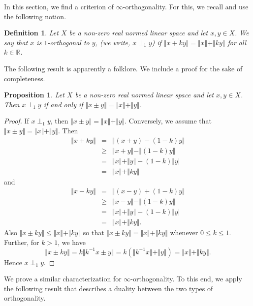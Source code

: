 \documentclass[12pt]{amsart}
\newtheorem{proposition}[theorem]{Proposition}
\newtheorem{definition}[theorem]{Definition}
\begin{document}
In this section, we find a criterion of $\infty$-orthogonality. For this, we recall and use the following notion.
\begin{definition}\cite{K14} 
	Let $X$ be a non-zero real normed linear space and let $x, y \in X$. We say that $x$ is $1$-orthogonal to $y$, (we write, $x \perp_1 y$) if $\Vert x + k y \Vert = \Vert x \Vert + \Vert k y \Vert$ for all $k \in \mathbb{R}$. %
\end{definition} 
The following result is apparently a folklore. We include a proof for the sake of completeness. 
\begin{proposition}\label{orth1}
	Let $X$ be a non-zero real normed linear space and let $x, y \in X$. Then $x \perp_1 y$ if and only if $\Vert x \pm y \Vert = \Vert x \Vert + \Vert y \Vert$. 
\end{proposition}
\begin{proof}
	If $x \perp_1 y$, then $\Vert x \pm y \Vert = \Vert x \Vert + \Vert y \Vert$. Conversely, we assume that $\Vert x \pm y \Vert = \Vert x \Vert + \Vert y \Vert$. Then 
	\begin{eqnarray*}
		\Vert x + k y \Vert &=& \Vert (x + y) - (1 - k) y \Vert \\ 
		&\ge& \Vert x + y \Vert - \Vert (1 - k) y \Vert \\ 
		&=& \Vert x \Vert + \Vert y \Vert - (1 - k) \Vert y \vert \\ 
		&=& \Vert x \Vert + \Vert k y \Vert
	\end{eqnarray*} 
	and 
	\begin{eqnarray*}
		\Vert x - k y \Vert &=& \Vert (x - y) + (1 - k) y \Vert \\ 
		&\ge& \Vert x - y \Vert - \Vert (1 - k) y \Vert \\ 
		&=& \Vert x \Vert + \Vert y \Vert - (1 - k) \Vert y \vert \\ 
		&=& \Vert x \Vert + \Vert k y \Vert. 
	\end{eqnarray*} 
	Also $\Vert x \pm k y \Vert \le \Vert x \Vert + \Vert k y \Vert$ so that $\Vert x \pm k y \Vert = \Vert x \Vert + \Vert k y \Vert$ whenever $0 \le k \le 1$. Further, for $k > 1$, we have 
	$$\Vert x \pm k y \Vert = k \Vert k^{-1} x \pm y \Vert = k (\Vert k^{-1} x \Vert + \Vert y \Vert) = \Vert x \Vert + \Vert k y \Vert.$$ 
	Hence $x \perp_1 y$.
\end{proof} 
We prove a similar characterization for $\infty$-orthogonality. To this end, we apply the following result that describes a duality between the two types of orthogonality.
\end{document}
